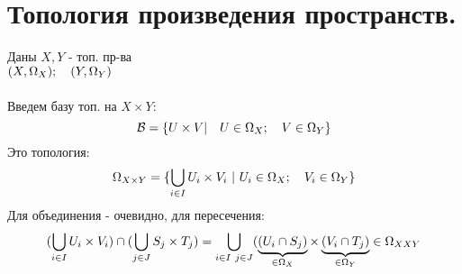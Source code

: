 \documentclass[geometry.tex]{subfiles}
\begin{document}
  \section{Топология произведения пространств.}

  \begin{example} [- конструкция]
      Даны $X, Y$ - топ. пр-ва\\
      $(X, \Omega_X); \q (Y, \Omega_Y)$ \\ \ \\
      Введем базу топ. на $X \times Y$:\\
      \[\B = \{U \times V | \q U \in \Omega_X; \q V \in \Omega_Y\}\]
      Это топология:
      \[\Omega_{X \times Y} = \{\bigcup_{i \in I} U_i \times V_i \ | \ U_i \in \Omega_X; \q V_i \in \Omega_Y\}\]
      Для объединения - очевидно, для пересечения:
      \[(\bigcup_{i \in I} U_i \times V_i) \cap (\bigcup_{j \in J} S_j \times T_j) =
      \bigcup_{i \in I \  j  \in J}
      (
          \ub{\in \Omega_X}{(U_i \cap S_j)}
          \times
          \ub{\in \Omega_Y}{(V_i \cap T_j
      )} \in \Omega_{XXY}\]
  \end{example}
\end{document}

